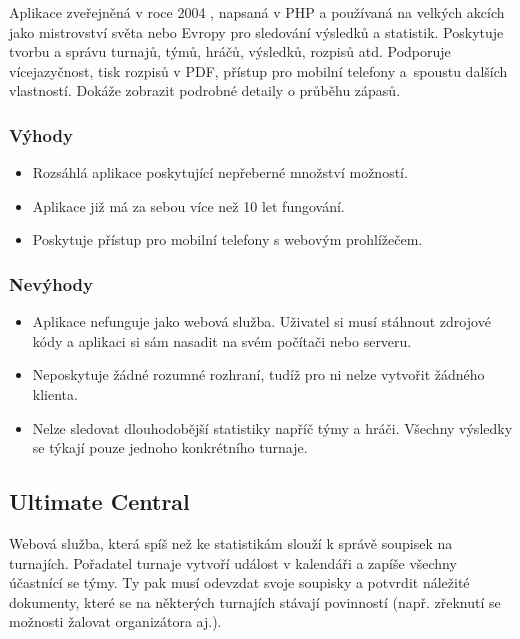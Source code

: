 Aplikace zveřejněná v roce 2004 \cite{ultimate-organizer}, napsaná v PHP a používaná na velkých akcích jako mistrovství světa nebo Evropy
pro sledování výsledků a statistik. Poskytuje tvorbu a správu turnajů, týmů, hráčů,
výsledků, rozpisů atd. Podporuje vícejazyčnost, tisk rozpisů v PDF, přístup pro mobilní telefony
a~spoustu dalších vlastností. Dokáže zobrazit podrobné detaily o průběhu zápasů.

\subsubsection*{Výhody}
\begin{itemize}
  \item Rozsáhlá aplikace poskytující nepřeberné množství možností.
  \item Aplikace již má za sebou více než 10 let fungování.
  \item Poskytuje přístup pro mobilní telefony s webovým prohlížečem.
\end{itemize}

\subsubsection*{Nevýhody}
\begin{itemize}
  \item Aplikace nefunguje jako webová služba. Uživatel si musí stáhnout zdrojové kódy a aplikaci si sám nasadit na svém počítači nebo serveru.
  \item Neposkytuje žádné rozumné rozhraní, tudíž pro ni nelze vytvořit žádného klienta.
  \item Nelze sledovat dlouhodobější statistiky napříč týmy a hráči. Všechny výsledky se týkají pouze jednoho konkrétního turnaje.
\end{itemize}

\subsection*{Ultimate Central}

Webová služba, která spíš než ke statistikám slouží k správě soupisek na turnajích. Pořadatel turnaje vytvoří událost
v kalendáři a zapíše všechny účastnící se týmy. Ty pak musí odevzdat svoje soupisky a potvrdit náležité dokumenty,
které se na některých turnajích stávají povinností (např. zřeknutí se možnosti žalovat organizátora aj.).

